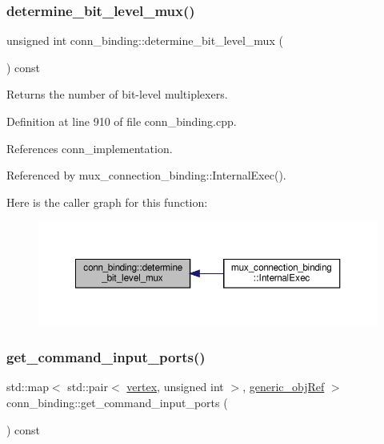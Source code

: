 \subsubsection{\texorpdfstring{determine\+\_\+bit\+\_\+level\+\_\+mux()}{determine\_bit\_level\_mux()}}
{\footnotesize\ttfamily unsigned int conn\+\_\+binding\+::determine\+\_\+bit\+\_\+level\+\_\+mux (\begin{DoxyParamCaption}{ }\end{DoxyParamCaption}) const}



Returns the number of bit-\/level multiplexers. 



Definition at line 910 of file conn\+\_\+binding.\+cpp.



References conn\+\_\+implementation.



Referenced by mux\+\_\+connection\+\_\+binding\+::\+Internal\+Exec().

Here is the caller graph for this function\+:
\nopagebreak
\begin{figure}[H]
\begin{center}
\leavevmode
\includegraphics[width=350pt]{d2/db1/classconn__binding_a6caea0ccfc30f9ef2d3a1a6452f08cb3_icgraph}
\end{center}
\end{figure}
\mbox{\label{classconn__binding_a71efbb9e5b43e9ae3978786144178b64}} 
\subsubsection{\texorpdfstring{get\+\_\+command\+\_\+input\+\_\+ports()}{get\_command\_input\_ports()}}
{\footnotesize\ttfamily std\+::map$<$ std\+::pair$<$ \hyperlink{graph_8hpp_abefdcf0544e601805af44eca032cca14}{vertex}, unsigned int $>$, \hyperlink{generic__obj_8hpp_acb533b2ef8e0fe72e09a04d20904ca81}{generic\+\_\+obj\+Ref} $>$ conn\+\_\+binding\+::get\+\_\+command\+\_\+input\+\_\+ports (\begin{DoxyParamCaption}{ }\end{DoxyParamCaption}) const}



